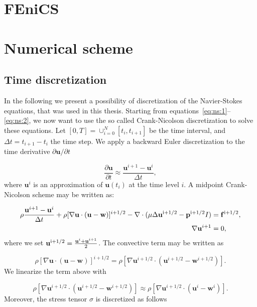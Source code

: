 \documentclass[11pt,a4paper,titlepage]{report}
\begin{document}

\section{FEniCS}

\section{Numerical scheme}

\subsection{Time discretization}
In the following we present a possibility of discretization of the Navier-Stokes equations, that was used in this thesis. Starting from equations~\eqref{eq:ns:1}--\eqref{eq:ns:2}, we now want to use the so called Crank-Nicolson discretization to solve these equations. Let $[0, T] = \cup^N_{i=0} [t_i, t_{i+1}] $ be the time interval, and $\Delta t = t_{i+1} - t_i$ the time step. We apply a backward Euler discretization to the time derivative $\partial \mathbf{u}/ \partial t$

\begin{equation}
\frac{\partial \mathbf{u}}{\partial t} \approx \frac{\mathbf{u}^{i+1} -\mathbf{u}^i }{\Delta t},
\end{equation}
where $\mathbf{u}^i$ is an approximation of $\mathbf{u}(t_i)$ at the time level $i$. A midpoint Crank-Nicolson scheme may be written as:

\begin{align}
\rho \frac{\mathbf{u}^{i+1} - \mathbf{u}^i}{\Delta t} + \rho [\nabla \mathbf{u} \cdot (\mathbf{u} - \mathbf{w})]^{i+1/2} - \nabla \cdot (\mu \Delta \mathbf{u}^{\rm  i+1/2} - \mathbf{p}^{\rm i+1/2}I) &= \mathbf{f}^{\rm i+1/2}, \\
\nabla \mathbf{u}^{i+1} &= 0,
\end{align}
where we set $\mathbf{u}^{\rm i+1/2} = \frac{\mathbf{u}^i + \mathbf{u}^{i+1}}{2}$.
The convective term may be written as

\begin{equation}
\rho [\nabla \mathbf{u} \cdot (\mathbf{u} - \mathbf{w})]^{i+1/2} = \rho [\nabla \mathbf{u}^{i+1/2} \cdot (\mathbf{u}^{i+1/2} - \mathbf{w}^{i+1/2})].
\end{equation}
We linearize the term above with

\begin{equation}
\rho [\nabla \mathbf{u}^{i+1/2} \cdot (\mathbf{u}^{i+1/2} - \mathbf{w}^{i+1/2})] \approx \rho [\nabla \mathbf{u}^{i+1/2} \cdot (\mathbf{u}^i - \mathbf{w}^i)].
\end{equation}
Moreover, the stress tensor $\sigma$ is discretized as follows 
\end{document}
